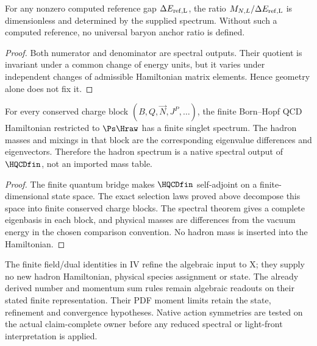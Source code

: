 \documentclass[12pt,a4paper]{article}
\begin{document}
\begin{corollary}
\label{p11:cor:dimensionless-baryon-anchor-floor}

For any nonzero computed reference gap \(\Delta E_{\rm ref,L}\), the ratio \(M_{N,L}/\Delta E_{\rm ref,L}\) is dimensionless and determined by the supplied spectrum.  Without such a computed reference, no universal baryon anchor ratio is defined.
\label{p11:eq:dimensionless-coherent-baryon-floor}
\end{corollary}
\begin{proof}

Both numerator and denominator are spectral outputs.  Their quotient is invariant under a common change of energy units, but it varies under independent changes of admissible Hamiltonian matrix elements.  Hence geometry alone does not fix it.
\end{proof}

\begin{theorem}
\label{p11:thm:finite-hadron-spectrum-closure}
For every conserved charge block \((B,Q,\vec N,J^P,\ldots)\), the finite Born--Hopf QCD Hamiltonian restricted to \(\Ps\Hraw\) has a finite singlet spectrum.  The hadron masses and mixings in that block are the corresponding eigenvalue differences and eigenvectors.  Therefore the hadron spectrum is a native spectral output of \(\HQCDfin\), not an imported mass table.
\end{theorem}
\begin{proof}
The finite quantum bridge makes \(\HQCDfin\) self-adjoint on a finite-dimensional state space.  The exact selection laws proved above decompose this space into finite conserved charge blocks.  The spectral theorem gives a complete eigenbasis in each block, and physical masses are differences from the vacuum energy in the chosen comparison convention.  No hadron mass is inserted into the Hamiltonian.\qedhere
\end{proof}

\begin{remark}
\label{p11:rem:m8-batch-qcd-readout-inputs}
The finite field/dual identities in IV refine the
algebraic input to X; they supply no new hadron
Hamiltonian, physical species assignment or state.
The already derived number and momentum sum rules
remain algebraic readouts on their stated finite
representation.  Their PDF moment limits retain the
state, refinement and convergence hypotheses.
Native action symmetries are tested on the actual
claim-complete owner before any reduced spectral or
light-front interpretation is applied.
\end{remark}
\end{document}
